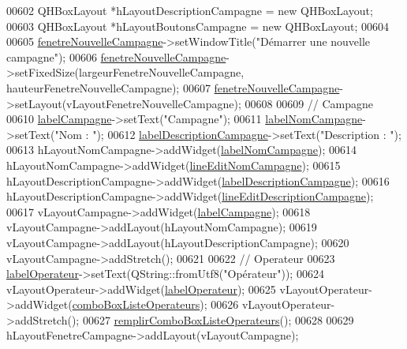 \begin{DoxyCode}
00602     QHBoxLayout *hLayoutDescriptionCampagne = \textcolor{keyword}{new} QHBoxLayout;
00603     QHBoxLayout *hLayoutBoutonsCampagne = \textcolor{keyword}{new} QHBoxLayout;
00604 
00605     \hyperlink{class_i_h_m_rov_a13c12a93de7fc77c32f0108ae73cec06}{fenetreNouvelleCampagne}->setWindowTitle(\textcolor{stringliteral}{"Démarrer une nouvelle campagne"});
00606     \hyperlink{class_i_h_m_rov_a13c12a93de7fc77c32f0108ae73cec06}{fenetreNouvelleCampagne}->setFixedSize(largeurFenetreNouvelleCampagne, 
      hauteurFenetreNouvelleCampagne);
00607     \hyperlink{class_i_h_m_rov_a13c12a93de7fc77c32f0108ae73cec06}{fenetreNouvelleCampagne}->setLayout(vLayoutFenetreNouvelleCampagne);
00608 
00609     \textcolor{comment}{// Campagne}
00610     \hyperlink{class_i_h_m_rov_a3ae7bec5b8f85f779ab58ba60556b37f}{labelCampagne}->setText(\textcolor{stringliteral}{"Campagne"});
00611     \hyperlink{class_i_h_m_rov_a723334735d6a20ea43f79567892cfd25}{labelNomCampagne}->setText(\textcolor{stringliteral}{"Nom : "});
00612     \hyperlink{class_i_h_m_rov_addac593dfa0ea112cf4cc1b3837ca5e0}{labelDescriptionCampagne}->setText(\textcolor{stringliteral}{"Description : "});
00613     hLayoutNomCampagne->addWidget(\hyperlink{class_i_h_m_rov_a723334735d6a20ea43f79567892cfd25}{labelNomCampagne});
00614     hLayoutNomCampagne->addWidget(\hyperlink{class_i_h_m_rov_a3b3dac7166ab414832dea0b5ad1a570d}{lineEditNomCampagne});
00615     hLayoutDescriptionCampagne->addWidget(\hyperlink{class_i_h_m_rov_addac593dfa0ea112cf4cc1b3837ca5e0}{labelDescriptionCampagne});
00616     hLayoutDescriptionCampagne->addWidget(\hyperlink{class_i_h_m_rov_aedf9fd0d893326f970aa1b73dbe06e85}{lineEditDescriptionCampagne});
00617     vLayoutCampagne->addWidget(\hyperlink{class_i_h_m_rov_a3ae7bec5b8f85f779ab58ba60556b37f}{labelCampagne});
00618     vLayoutCampagne->addLayout(hLayoutNomCampagne);
00619     vLayoutCampagne->addLayout(hLayoutDescriptionCampagne);
00620     vLayoutCampagne->addStretch();
00621 
00622     \textcolor{comment}{// Operateur}
00623     \hyperlink{class_i_h_m_rov_a1855235995ed076748b568a1702355c9}{labelOperateur}->setText(QString::fromUtf8(\textcolor{stringliteral}{"Opérateur"}));
00624     vLayoutOperateur->addWidget(\hyperlink{class_i_h_m_rov_a1855235995ed076748b568a1702355c9}{labelOperateur});
00625     vLayoutOperateur->addWidget(\hyperlink{class_i_h_m_rov_a32ee4423982fa3a78e59167ed2354f6e}{comboBoxListeOperateurs});
00626     vLayoutOperateur->addStretch();
00627     \hyperlink{class_i_h_m_rov_a752a8dc2b3b68d536e94ff8bfb62f46f}{remplirComboBoxListeOperateurs}();
00628 
00629     hLayoutFenetreCampagne->addLayout(vLayoutCampagne);

\end{DoxyCode}
